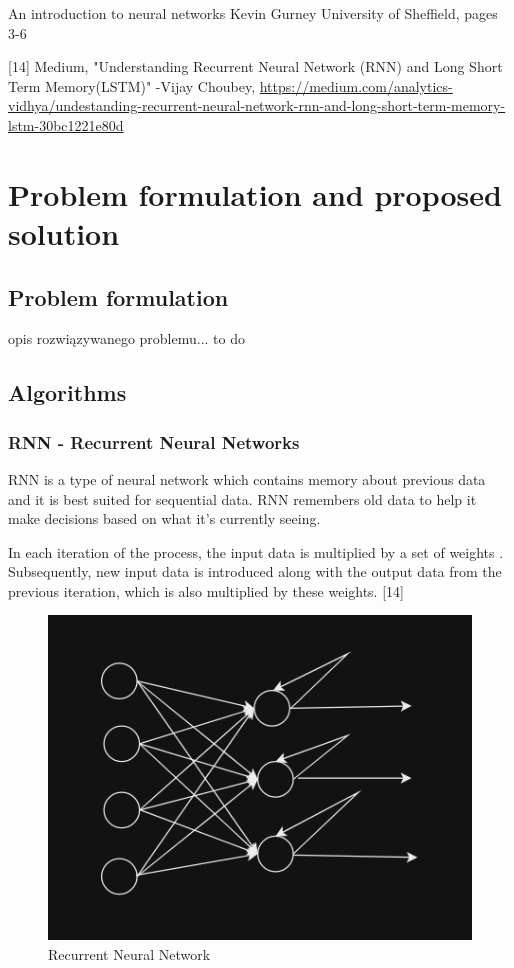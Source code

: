 \documentclass{article}
\begin{document}
\begin{flushleft}
\begin{justify}
[13] An introduction to neural networks Kevin Gurney University of Sheffield, pages 3-6

[14] Medium, "Understanding Recurrent Neural Network (RNN) and Long Short Term Memory(LSTM)" -Vijay Choubey, \url{https://medium.com/analytics-vidhya/undestanding-recurrent-neural-network-rnn-and-long-short-term-memory-lstm-30bc1221e80d}



\section{Problem formulation and proposed solution}
\subsection{Problem formulation}
opis rozwiązywanego problemu...
to do
\subsection{Algorithms}
\subsubsection{RNN - Recurrent Neural Networks}
RNN is a type of neural network which contains memory about previous data and it is best suited for sequential data. RNN remembers old data to help it make decisions based on what it's currently seeing. 

In each iteration of the process, the input data is multiplied by a set of weights . Subsequently, new input data is introduced along with the output data from the previous iteration, which is also multiplied by these weights. [14]

\begin{figure}[H]
\centering 
\caption{Recurrent Neural Network}
\includegraphics{imgs/rnn.png}


\end{figure}
\end{justify}
\end{flushleft}
\end{document}
